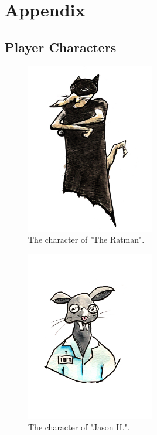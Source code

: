 \documentclass[12pt]{IEEEtran}
\begin{document}
\section{Appendix}
\label{sec:appendix}

\subsection{Player Characters}
\label{subsec:characters}

	\begin{figure}[h]
		\centering
		\includegraphics[width=0.5\textwidth]{Rat_Ratman.jpg}
		\caption{The character of "The Ratman".}
		\label{fig:ratman}
	\end{figure}

	\begin{figure}[h]
		\centering
		\includegraphics[width=0.5\textwidth]{Rat_Jason.jpg}
		\caption{The character of "Jason H.".}
		\label{fig:jason}
	\end{figure}
	
\end{document}

